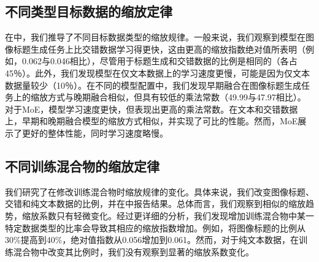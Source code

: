 \subsection{不同类型目标数据的缩放定律}
在中，我们推导了不同目标数据类型的缩放规律。一般来说，我们观察到模型在图像标题生成任务上比交错数据学习得更快，这由更高的缩放指数绝对值所表明（例如，0.062与0.046相比），尽管用于标题生成和交错数据的比例是相同的（各占45％）。此外，我们发现模型在仅文本数据上的学习速度更慢，可能是因为仅文本数据量较少（10％）。在不同的模型配置中，我们发现早期融合在图像标题生成任务上的缩放方式与晚期融合相似，但具有较低的乘法常数（49.99与47.97相比）。对于MoE，模型学习速度更快，但表现出更高的乘法常数。在文本和交错数据上，早期和晚期融合模型的缩放方式相似，并实现了可比的性能。然而，MoE展示了更好的整体性能，同时学习速度略慢。






\subsection{不同训练混合物的缩放定律}

我们研究了在修改训练混合物时缩放规律的变化。具体来说，我们改变图像标题、交错和纯文本数据的比例，并在中报告结果。总体而言，我们观察到相似的缩放趋势，缩放系数只有轻微变化。经过更详细的分析，我们发现增加训练混合物中某一特定数据类型的比率会导致其相应的缩放指数增加。例如，将图像标题的比例从30\%提高到40\%，绝对值指数从0.056增加到0.061。然而，对于纯文本数据，在训练混合物中改变其比例时，我们没有观察到显著的缩放系数变化。















    
                                 
                                     
                            




                    
                        
                    
                    



